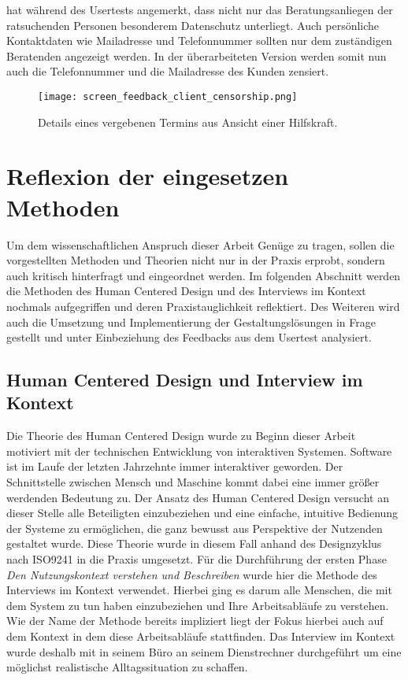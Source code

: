 \ipName hat während des Usertests angemerkt, dass nicht nur das Beratungsanliegen der ratsuchenden Personen besonderem Datenschutz unterliegt. Auch persönliche Kontaktdaten wie Mailadresse und Telefonnummer sollten nur dem zuständigen Beratenden angezeigt werden. In der überarbeiteten Version werden somit nun auch die Telefonnummer und die Mailadresse des Kunden zensiert.

\begin{figure}[H]
    \caption{Details eines vergebenen Termins aus Ansicht einer Hilfskraft.}
    \centering
    \texttt{[image: screen\_feedback\_client\_censorship.png]}
\end{figure}

\section{Reflexion der eingesetzen Methoden}
\label{subsection:reflection}

Um dem wissenschaftlichen Anspruch dieser Arbeit Genüge zu tragen, sollen die
vorgestellten Methoden und Theorien nicht nur in der Praxis erprobt, sondern
auch kritisch hinterfragt und eingeordnet werden. Im folgenden Abschnitt werden
die Methoden des Human Centered Design und des Interviews im Kontext nochmals
aufgegriffen und deren Praxistauglichkeit reflektiert. Des Weiteren wird auch
die Umsetzung und Implementierung der Gestaltungslösungen in Frage gestellt und
unter Einbeziehung des Feedbacks aus dem Usertest analysiert.

\subsection*{Human Centered Design und Interview im Kontext}
Die Theorie des Human Centered Design wurde zu Beginn dieser Arbeit motiviert
mit der technischen Entwicklung von interaktiven Systemen. Software ist im
Laufe der letzten Jahrzehnte immer interaktiver geworden. Der Schnittstelle
zwischen Mensch und Maschine kommt dabei eine immer größer werdenden Bedeutung
zu\cite{hci}. Der Ansatz des Human Centered Design versucht an dieser Stelle
alle Beteiligten einzubeziehen und eine einfache, intuitive Bedienung der
Systeme zu ermöglichen, die ganz bewusst aus Perspektive der Nutzenden
gestaltet wurde\cite{sequenceDiagrams}. Diese Theorie wurde in diesem Fall
anhand des Designzyklus nach ISO9241 in die Praxis umgesetzt. Für die
Durchführung der ersten Phase \textit{Den Nutzungskontext verstehen und
    Beschreiben} wurde hier die Methode des Interviews im Kontext verwendet.
Hierbei ging es darum alle Menschen, die mit dem System zu tun haben
einzubeziehen und Ihre Arbeitsabläufe zu verstehen. Wie der Name der Methode
bereits impliziert liegt der Fokus hierbei auch auf dem Kontext in dem diese
Arbeitsabläufe stattfinden\cite{hciHandbook}. Das Interview im Kontext wurde
deshalb mit \ipName in seinem Büro an seinem Dienstrechner durchgeführt um eine
möglichst realistische Alltagssituation zu schaffen.

